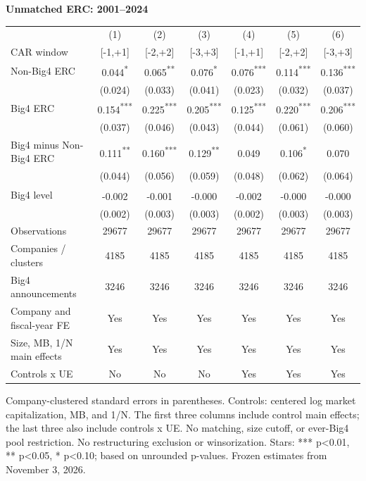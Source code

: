 \documentclass[10pt]{article}
\newcommand{\sym}[1]{\textsuperscript{#1}}\pagestyle{empty}
\begin{document}
\noindent\textbf{Unmatched ERC: 2001--2024}\par\medskip
\setlength{\tabcolsep}{3pt}\renewcommand{\arraystretch}{1.1}
\noindent\begin{tabular*}{\textwidth}{@{\extracolsep{\fill}}lcccccc@{}}\toprule
 & (1) & (2) & (3) & (4) & (5) & (6) \\
CAR window & [-1,+1] & [-2,+2] & [-3,+3] & [-1,+1] & [-2,+2] & [-3,+3] \\\midrule
Non-Big4 ERC & 0.044\sym{*} & 0.065\sym{**} & 0.076\sym{*} & 0.076\sym{***} & 0.114\sym{***} & 0.136\sym{***} \\
 & (0.024) & (0.033) & (0.041) & (0.023) & (0.032) & (0.037) \\
Big4 ERC & 0.154\sym{***} & 0.225\sym{***} & 0.205\sym{***} & 0.125\sym{***} & 0.220\sym{***} & 0.206\sym{***} \\
 & (0.037) & (0.046) & (0.043) & (0.044) & (0.061) & (0.060) \\
Big4 minus Non-Big4 ERC & 0.111\sym{**} & 0.160\sym{***} & 0.129\sym{**} & 0.049\sym{} & 0.106\sym{*} & 0.070\sym{} \\
 & (0.044) & (0.056) & (0.059) & (0.048) & (0.062) & (0.064) \\
Big4 level & -0.002\sym{} & -0.001\sym{} & -0.000\sym{} & -0.002\sym{} & -0.000\sym{} & -0.000\sym{} \\
 & (0.002) & (0.003) & (0.003) & (0.002) & (0.003) & (0.003) \\
Observations & 29677 & 29677 & 29677 & 29677 & 29677 & 29677 \\
Companies / clusters & 4185 & 4185 & 4185 & 4185 & 4185 & 4185 \\
Big4 announcements & 3246 & 3246 & 3246 & 3246 & 3246 & 3246 \\
Company and fiscal-year FE & Yes & Yes & Yes & Yes & Yes & Yes \\
Size, MB, 1/N main effects & Yes & Yes & Yes & Yes & Yes & Yes \\
Controls x UE & No & No & No & Yes & Yes & Yes \\
\bottomrule\end{tabular*}\par\medskip
\noindent\footnotesize Company-clustered standard errors in parentheses. Controls: centered log market capitalization, MB, and 1/N. The first three columns include control main effects; the last three also include controls x UE. No matching, size cutoff, or ever-Big4 pool restriction. No restructuring exclusion or winsorization. Stars: *** p<0.01, ** p<0.05, * p<0.10; based on unrounded p-values. Frozen estimates from November 3, 2026.
\end{document}
